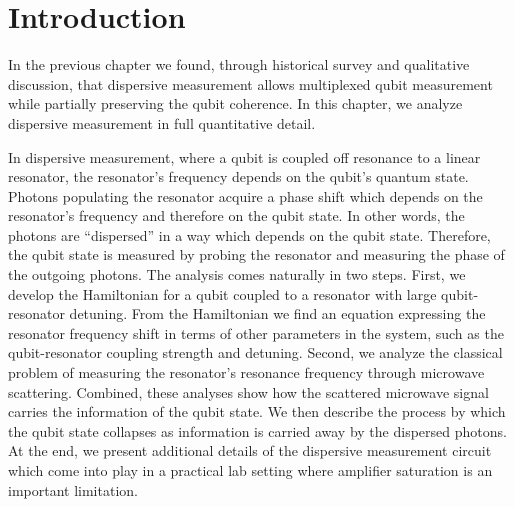 \section{Introduction}

In the previous chapter we found, through historical survey and qualitative discussion, that dispersive measurement allows multiplexed qubit measurement while partially preserving the qubit coherence.
In this chapter, we analyze dispersive measurement in full quantitative detail.

In dispersive measurement, where a qubit is coupled off resonance to a linear resonator, the resonator's frequency depends on the qubit's quantum state.
Photons populating the resonator acquire a phase shift which depends on the resonator's frequency and therefore on the qubit state.
In other words, the photons are ``dispersed'' in a way which depends on the qubit state.
Therefore, the qubit state is measured by probing the resonator and measuring the phase of the outgoing photons.
The analysis comes naturally in two steps.
First, we develop the Hamiltonian for a qubit coupled to a resonator with large qubit-resonator detuning.
From the Hamiltonian we find an equation expressing the resonator frequency shift in terms of other parameters in the system, such as the qubit-resonator coupling strength and detuning.
Second, we analyze the classical problem of measuring the resonator's resonance frequency through microwave scattering.
Combined, these analyses show how the scattered microwave signal carries the information of the qubit state.
We then describe the process by which the qubit state collapses as information is carried away by the dispersed photons.
At the end, we present additional details of the dispersive measurement circuit which come into play in a practical lab setting where amplifier saturation is an important limitation.

